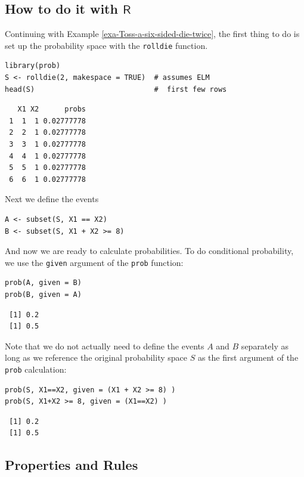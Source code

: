 \documentclass[captions=tableheading]{scrbook}
\begin{document}
\subsection{How to do it with \(\mathsf{R}\)}
\label{sec-4-6-1}


Continuing with Example \ref{exa-Toss-a-six-sided-die-twice}, the first thing to do is set up the probability space with the \texttt{rolldie} function.


\begin{verbatim}
library(prob)
S <- rolldie(2, makespace = TRUE)  # assumes ELM
head(S)                            #  first few rows
\end{verbatim}

\begin{verbatim}
   X1 X2      probs
 1  1  1 0.02777778
 2  2  1 0.02777778
 3  3  1 0.02777778
 4  4  1 0.02777778
 5  5  1 0.02777778
 6  6  1 0.02777778
\end{verbatim}

Next we define the events


\begin{verbatim}
A <- subset(S, X1 == X2)
B <- subset(S, X1 + X2 >= 8)
\end{verbatim}

And now we are ready to calculate probabilities. To do conditional probability, we use the \texttt{given} argument of the \texttt{prob} function:


\begin{verbatim}
prob(A, given = B)
prob(B, given = A)
\end{verbatim}

\begin{verbatim}
 [1] 0.2
 [1] 0.5
\end{verbatim}

Note that we do not actually need to define the events \(A\) and \(B\) separately as long as we reference the original probability space \(S\) as the first argument of the \texttt{prob} calculation:


\begin{verbatim}
prob(S, X1==X2, given = (X1 + X2 >= 8) )
prob(S, X1+X2 >= 8, given = (X1==X2) )
\end{verbatim}

\begin{verbatim}
 [1] 0.2
 [1] 0.5
\end{verbatim}
\subsection{Properties and Rules}
\label{sec-4-6-2}
\end{document}
